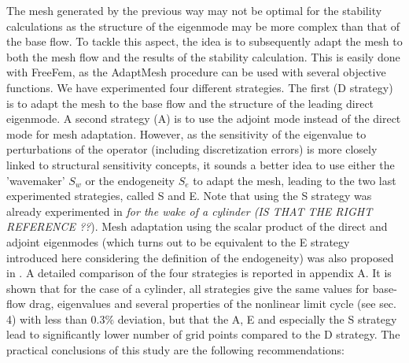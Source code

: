 \documentclass[twocolumn,10pt]{asme2ej}
\begin{document}
The mesh generated by the previous way may not be optimal for the stability calculations as the structure of the eigenmode may be more complex than that of the base flow. 
To tackle this aspect, the idea is to subsequently adapt the mesh to both the mesh flow and the results of the stability calculation.
This is easily done with FreeFem, as the  AdaptMesh procedure can be used with several objective functions.
We have experimented four different strategies.
The first (D strategy) is to adapt the mesh to the base flow and the structure of the leading direct eigenmode.
A second strategy (A) is to use the adjoint mode instead of the direct mode for mesh adaptation.
However, as the sensitivity of the eigenvalue to perturbations of the operator (including discretization errors) is more closely linked to structural sensitivity concepts, it sounds a better idea to use either the 'wavemaker' $S_w$ or the endogeneity $S_e$ to adapt the mesh, leading to the two last experimented strategies, called S and E.
Note that using the S strategy was already experimented in {\em \cite{GiannettiLuchini} for the wake of a cylinder (IS THAT THE RIGHT REFERENCE ??}).
Mesh adaptation using the scalar product of the direct and adjoint eigenmodes (which turns out to be equivalent to the E strategy introduced here considering the definition of the endogeneity) was also proposed in \cite{mavripilis2015adjoint}.
A detailed comparison of the four strategies is reported in appendix A.
It is shown that for the case of a cylinder, all strategies give the same values for base-flow drag, eigenvalues and several properties of the nonlinear limit cycle (see sec. 4) with less than $0.3\%$ deviation, but that the A, E and especially the S strategy lead to significantly lower number of grid points compared to the D strategy.
The practical conclusions of this study are the following recommendations:
\end{document}
